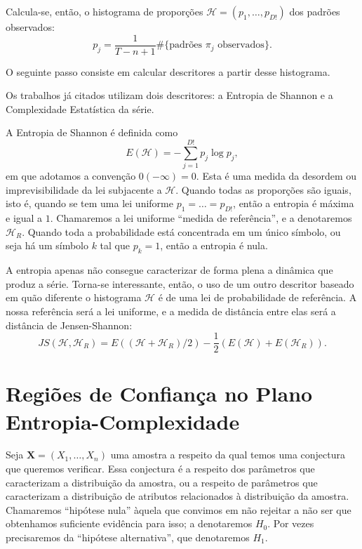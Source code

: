 Calcula-se, então, o histograma de proporções $\mathcal{H} =(p_1,\dots,p_{D!})$ dos padrões observados:
$$
p_j = \frac{1}{T-n+1} \# \{
\text{padrões } \pi_j \text{ observados}
\}.
$$

O seguinte passo consiste em calcular descritores a partir desse histograma.

Os trabalhos já citados utilizam dois descritores: a Entropia de Shannon e a Complexidade Estatística da série.

A Entropia de Shannon é definida como
$$
E(\mathcal H) = -\sum_{j=1}^{D!} p_j \log p_j,
$$
em que adotamos a convenção $0(-\infty)=0$.
Esta é uma medida da desordem ou imprevisibilidade da lei subjacente a $\mathcal H$.
Quando todas as proporções são iguais, isto é, quando se tem uma lei uniforme $p_1=\dots=p_{D!}$, então a entropia é máxima e igual a $1$.
Chamaremos a lei uniforme ``medida de referência'', e a denotaremos $\mathcal H_R$.
Quando toda a probabilidade está concentrada em um único símbolo, ou seja há um símbolo $k$ tal que $p_k=1$, então a entropia é nula.

A entropia apenas não consegue caracterizar de forma plena a dinâmica que produz a série.
Torna-se interessante, então, o uso de um outro descritor baseado em quão diferente o histograma $\mathcal H$ é de uma lei de probabilidade de referência.
A nossa referência será a lei uniforme, e a medida de distância entre elas será a distância de Jensen-Shannon:
$$
JS(\mathcal H, \mathcal H_R) = E((\mathcal H+ \mathcal H_R)/2) -\frac{1}{2}(E(\mathcal H) + E(\mathcal H_R)).
$$



\section{Regiões de Confiança no Plano Entropia-Complexidade}

Seja $\bm X = (X_1, \dots, X_n)$ uma amostra a respeito da qual temos uma conjectura que queremos verificar.
Essa conjectura é a respeito dos parâmetros que caracterizam a distribuição da amostra, ou a respeito de parâmetros que caracterizam a distribuição de atributos relacionados à distribuição da amostra.
Chamaremos ``hipótese nula'' àquela que convimos em não rejeitar a não ser que obtenhamos suficiente evidência para isso; a denotaremos $H_0$.
Por vezes precisaremos da ``hipótese alternativa'', que denotaremos $H_1$.

